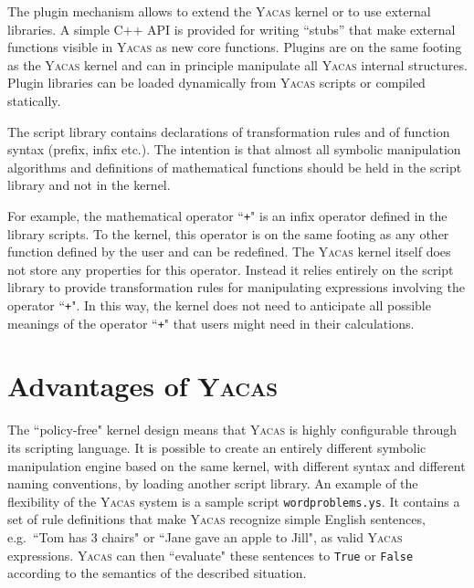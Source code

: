 \documentclass{llncs}
\begin{document}
The plugin mechanism allows to extend the \textsc{Yacas} kernel or to use external libraries. A simple C++ API is provided for writing ``stubs'' that make external functions visible in \textsc{Yacas} as new core functions. Plugins are on the same footing as the \textsc{Yacas} kernel and can in principle manipulate all \textsc{Yacas} internal structures. Plugin libraries can be loaded dynamically from \textsc{Yacas} scripts or compiled statically.

%
The script library contains declarations of transformation rules and of function
syntax (prefix, infix etc.). The intention is that almost all symbolic manipulation algorithms and definitions
of mathematical functions should be held in the script library and not in the kernel. 


For example, the mathematical operator ``\texttt{+}" is an infix operator defined in the
library scripts. To the kernel, this operator is on the same footing as any
other function defined by the user and can be redefined. The \textsc{Yacas} kernel
itself does not store any properties for this operator. Instead it relies
entirely on the script library to provide transformation rules for manipulating
expressions involving the operator ``\texttt{+}". In this way, the kernel does not need
to anticipate all possible meanings of the operator ``\texttt{+}" that users might need
in their calculations.

\section{Advantages of \textsc{Yacas}}

The ``policy-free" kernel design means that \textsc{Yacas} is highly configurable
through its scripting language. It is possible to create an entirely different
symbolic manipulation engine based on the same kernel, with different syntax
and different naming  conventions, by loading another script library. An example of the flexibility of the
\textsc{Yacas} system is a sample script \texttt{wordproblems.ys}. It contains
a set of rule definitions that make \textsc{Yacas} recognize simple English
sentences, e.g.~``Tom has 3 chairs" or ``Jane gave an apple to Jill", as
valid \textsc{Yacas} expressions. \textsc{Yacas} can then ``evaluate" these
sentences to \texttt{True} or \texttt{False} according to the semantics of the
described situation.
\end{document}
